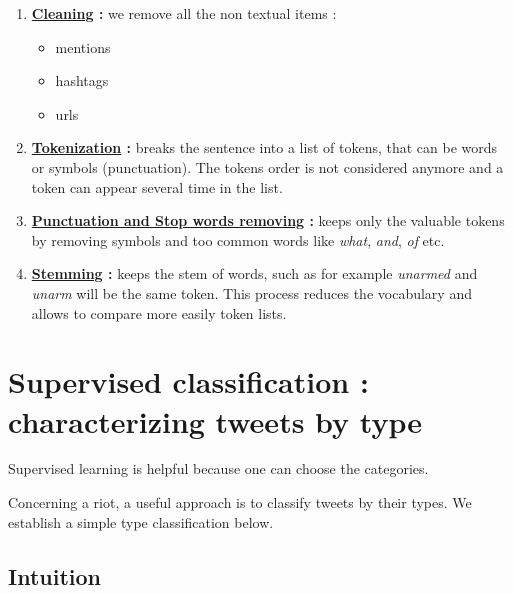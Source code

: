 \documentclass[a4paper,twoside,12pt,openright]{report}
\begin{document}
\begin{enumerate}
\item \textbf{\underline{Cleaning} :} we remove all the non textual items : 
  \begin{itemize}
    \item mentions
    \item hashtags
    \item urls
  \end{itemize}
\item \textbf{\underline{Tokenization} :} breaks the sentence into a list of tokens, that can be words or symbols (punctuation). The tokens order is not considered anymore and a token can appear several time in the list.  \\[10pt]
\item \textbf{\underline{Punctuation and Stop words removing} :}  keeps only the valuable tokens by removing symbols and too common words like \emph{what}, \emph{and}, \emph{of} etc.\\[10pt]
\item \textbf{\underline{Stemming} :} keeps the stem of words, such as for example \emph{unarmed} and \emph{unarm} will be the same token. This process reduces the vocabulary and allows to compare more easily token lists.\\[10pt]

\end{enumerate}

\newpage
\section{Supervised classification : characterizing tweets by type}
Supervised learning is helpful because one can choose the categories. 

Concerning a riot, a useful approach is to classify tweets by their types. We establish a simple type classification below.

\subsection{Intuition}
\end{document}
